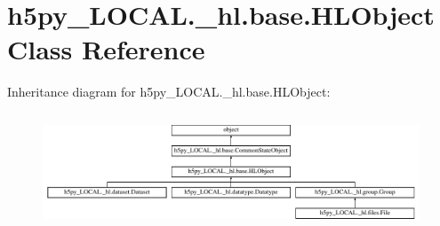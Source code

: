 \hypertarget{classh5py__LOCAL_1_1__hl_1_1base_1_1HLObject}{}\section{h5py\+\_\+\+L\+O\+C\+A\+L.\+\_\+hl.\+base.\+H\+L\+Object Class Reference}
\label{classh5py__LOCAL_1_1__hl_1_1base_1_1HLObject}
Inheritance diagram for h5py\+\_\+\+L\+O\+C\+A\+L.\+\_\+hl.\+base.\+H\+L\+Object\+:\begin{figure}[H]
\begin{center}
\leavevmode
\includegraphics[height=3.508772cm]{classh5py__LOCAL_1_1__hl_1_1base_1_1HLObject}
\end{center}
\end{figure}
